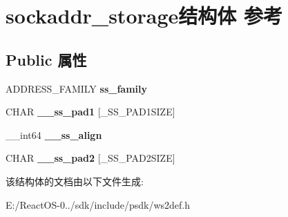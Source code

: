 \hypertarget{structsockaddr__storage}{}\section{sockaddr\+\_\+storage结构体 参考}
\label{structsockaddr__storage}
\subsection*{Public 属性}
\begin{DoxyCompactItemize}
\item 
\mbox{\label{structsockaddr__storage_a673adc4fe7f0285529bae693e4f83723}} 
A\+D\+D\+R\+E\+S\+S\+\_\+\+F\+A\+M\+I\+LY {\bfseries ss\+\_\+family}
\item 
\mbox{\label{structsockaddr__storage_abdb36be85f8ed3b8c05ada7907d63efa}} 
C\+H\+AR {\bfseries \+\_\+\+\_\+ss\+\_\+pad1} \mbox{[}\+\_\+\+S\+S\+\_\+\+P\+A\+D1\+S\+I\+ZE\mbox{]}
\item 
\mbox{\label{structsockaddr__storage_a9dae9bfef9e12614199939aaded36ad4}} 
\+\_\+\+\_\+int64 {\bfseries \+\_\+\+\_\+ss\+\_\+align}
\item 
\mbox{\label{structsockaddr__storage_acac8d5cd51ca75bb92ad59914dc761c7}} 
C\+H\+AR {\bfseries \+\_\+\+\_\+ss\+\_\+pad2} \mbox{[}\+\_\+\+S\+S\+\_\+\+P\+A\+D2\+S\+I\+ZE\mbox{]}
\end{DoxyCompactItemize}


该结构体的文档由以下文件生成\+:\begin{DoxyCompactItemize}
\item 
E\+:/\+React\+O\+S-\/0../sdk/include/psdk/ws2def.\+h\end{DoxyCompactItemize}
